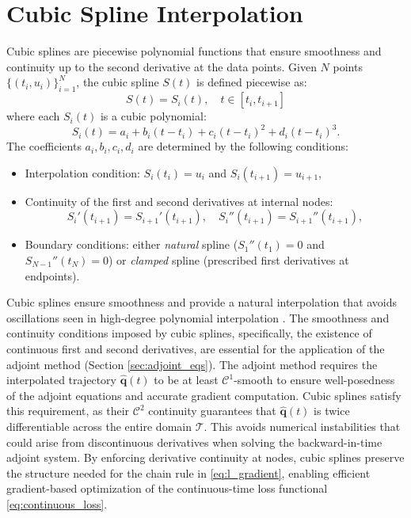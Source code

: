 \section*{Cubic Spline Interpolation}
\label{sec:cubic_interp}
Cubic splines are piecewise polynomial functions that ensure smoothness and continuity up to the second derivative at the data points. Given $ N $ points $ \{ (t_i, u_i) \}_{i=1}^N $, the cubic spline $S(t)$ is defined piecewise as:\\
$$S(t) = S_i(t), \quad t \in [t_i, t_{i+1}]$$
where each $S_i(t)$ is a cubic polynomial:\\
$$ S_i(t) = a_i + b_i (t - t_i) + c_i (t - t_i)^2 + d_i (t - t_i)^3.$$
The coefficients $ a_i, b_i, c_i, d_i $ are determined by the following conditions:
\begin{itemize}
    \item Interpolation condition: $S_i(t_i) = u_i$ and $S_i(t_{i+1}) = u_{i+1}$,
    \item Continuity of the first and second derivatives at internal nodes:\\
    $$S_i'(t_{i+1}) = S_{i+1}'(t_{i+1}), \quad S_i''(t_{i+1}) = S_{i+1}''(t_{i+1}),$$
    \item Boundary conditions: either \textit{natural} spline ($S_1''(t_1) = 0$ and $S_{N-1}''(t_N) = 0$) or \textit{clamped} spline (prescribed first derivatives at endpoints).
\end{itemize}
Cubic splines ensure smoothness and provide a natural interpolation that avoids oscillations seen in high-degree polynomial interpolation \cite{de1978practical}. The smoothness and continuity conditions imposed by cubic splines, specifically, the existence of continuous first and second derivatives, are essential for the application of the adjoint method (Section \ref{sec:adjoint_eqs}). The adjoint method requires the interpolated trajectory $\hat{\mathbf{q}}(t)$ to be at least $\mathcal{C}^1$-smooth to ensure well-posedness of the adjoint equations and accurate gradient computation. Cubic splines satisfy this requirement, as their $\mathcal{C}^2$ continuity guarantees that $\hat{\mathbf{q}}(t)$ is twice differentiable across the entire domain $\mathcal{T}$. This avoids numerical instabilities that could arise from discontinuous derivatives when solving the backward-in-time adjoint system. By enforcing derivative continuity at nodes, cubic splines preserve the structure needed for the chain rule in \eqref{eq:l_gradient}, enabling efficient gradient-based optimization of the continuous-time loss functional \eqref{eq:continuous_loss}.





